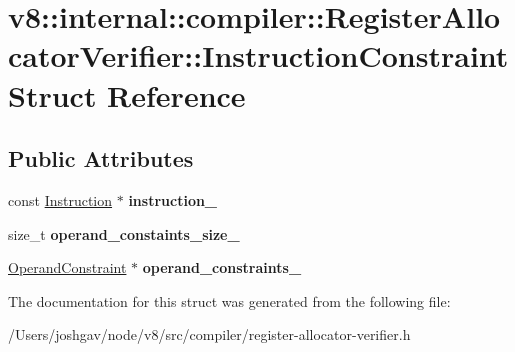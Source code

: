 \hypertarget{structv8_1_1internal_1_1compiler_1_1_register_allocator_verifier_1_1_instruction_constraint}{}\section{v8\+:\+:internal\+:\+:compiler\+:\+:Register\+Allocator\+Verifier\+:\+:Instruction\+Constraint Struct Reference}
\label{structv8_1_1internal_1_1compiler_1_1_register_allocator_verifier_1_1_instruction_constraint}
\subsection*{Public Attributes}
\begin{DoxyCompactItemize}
\item 
const \hyperlink{classv8_1_1internal_1_1compiler_1_1_instruction}{Instruction} $\ast$ {\bfseries instruction\+\_\+}\hypertarget{structv8_1_1internal_1_1compiler_1_1_register_allocator_verifier_1_1_instruction_constraint_af2097671093bad3de6973b63f3556a5b}{}\label{structv8_1_1internal_1_1compiler_1_1_register_allocator_verifier_1_1_instruction_constraint_af2097671093bad3de6973b63f3556a5b}

\item 
size\+\_\+t {\bfseries operand\+\_\+constaints\+\_\+size\+\_\+}\hypertarget{structv8_1_1internal_1_1compiler_1_1_register_allocator_verifier_1_1_instruction_constraint_a90cffb83369479be33ad7b093e5b2d0c}{}\label{structv8_1_1internal_1_1compiler_1_1_register_allocator_verifier_1_1_instruction_constraint_a90cffb83369479be33ad7b093e5b2d0c}

\item 
\hyperlink{structv8_1_1internal_1_1compiler_1_1_register_allocator_verifier_1_1_operand_constraint}{Operand\+Constraint} $\ast$ {\bfseries operand\+\_\+constraints\+\_\+}\hypertarget{structv8_1_1internal_1_1compiler_1_1_register_allocator_verifier_1_1_instruction_constraint_a06701871c29590276eef6d6cc4530f45}{}\label{structv8_1_1internal_1_1compiler_1_1_register_allocator_verifier_1_1_instruction_constraint_a06701871c29590276eef6d6cc4530f45}

\end{DoxyCompactItemize}


The documentation for this struct was generated from the following file\+:\begin{DoxyCompactItemize}
\item 
/\+Users/joshgav/node/v8/src/compiler/register-\/allocator-\/verifier.\+h\end{DoxyCompactItemize}
